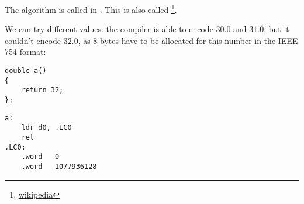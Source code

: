 The algorithm is called  in \ARMSixFourRefURL.
This is also called \footnote{\href{http://go.yurichev.com/17139}{wikipedia}}.

We can try different values: the compiler is able to encode $30.0$ and $31.0$, but it couldn't encode $32.0$,
as 8 bytes have to be allocated for this number in the IEEE 754 format:

\begin{lstlisting}[style=customc]
double a()
{
	return 32;
};
\end{lstlisting}

\begin{lstlisting}[caption=GCC 4.9.1 -O3,style=customasmARM]
a:
	ldr	d0, .LC0
	ret
.LC0:
	.word	0
	.word	1077936128
\end{lstlisting}
